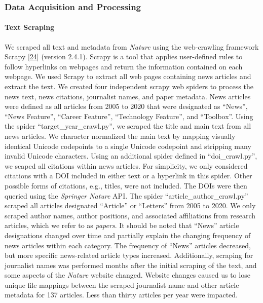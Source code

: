 \hypertarget{data-acquisition-and-processing}{%
\subsubsection{Data Acquisition and Processing}\label{data-acquisition-and-processing}}

\hypertarget{text-scraping}{%
\paragraph{Text Scraping}\label{text-scraping}}

We scraped all text and metadata from \emph{Nature} using the web-crawling framework Scrapy {[}\protect\hyperlink{ref-mfJiAqsK}{24}{]} (version 2.4.1).
Scrapy is a tool that applies user-defined rules to follow hyperlinks on webpages and return the information contained on each webpage.
We used Scrapy to extract all web pages containing news articles and extract the text.
We created four independent scrapy web spiders to process the news text, news citations, journalist names, and paper metadata.
News articles were defined as all articles from 2005 to 2020 that were designated as ``News'', ``News Feature'', ``Career Feature'', ``Technology Feature'', and ``Toolbox''.
Using the spider ``target\_year\_crawl.py'', we scraped the title and main text from all news articles.
We character normalized the main text by mapping visually identical Unicode codepoints to a single Unicode codepoint and stripping many invalid Unicode characters.
Using an additional spider defined in ``doi\_crawl.py'', we scaped all citations within news articles.
For simplicity, we only considered citations with a DOI included in either text or a hyperlink in this spider.
Other possible forms of citations, e.g., titles, were not included.
The DOIs were then queried using the \emph{Springer Nature} API.
The spider ``article\_author\_crawl.py'' scraped all articles designated ``Article'' or ``Letters'' from 2005 to 2020.
We only scraped author names, author positions, and associated affiliations from research articles, which we refer to as \emph{papers}.
It should be noted that ``News'' article designations changed over time and partially explain the changing frequency of news articles within each category.
The frequency of ``News'' articles decreased, but more specific news-related article types increased.
Additionally, scraping for journalist names was performed months after the initial scraping of the text, and some aspects of the \emph{Nature} website changed.
Website changes caused us to lose unique file mappings between the scraped journalist name and other article metadata for 137 articles.
Less than thirty articles per year were impacted.

